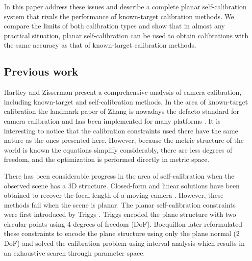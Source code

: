 \documentclass[10pt,twocolumn,letterpaper]{article}
\begin{document}
In this paper address these issues and describe a complete planar self-calibration system that rivals the performance of known-target calibration methods. We compare the limits of both calibration types and show that in almost any practical situation, planar self-calibration can be used to obtain calibrations with the same accuracy as that of known-target calibration methods.


\subsection{Previous work}

Hartley and Zisserman \cite{hartley2003} present a comprehensive analysis of camera calibration, including known-target and self-calibration methods. In the area of known-target calibration the landmark paper of Zhang \cite{zhang1999} is nowadays the defacto standard for camera calibration and has been implemented for many platforms \cite{bouguetMCT,opencv_library}. It is interesting to notice that the calibration constraints used there have the same nature as the ones presented here. However, because the metric structure of the world is known the equations simplify considerably, there are less degrees of freedom, and the optimization is performed directly in metric space. 

There has been considerable progress in the area of self-calibration when the observed scene has a 3D structure. Closed-form and linear solutions have been obtained to recover the focal length of a moving camera \cite{bougnoux1998}. However, these methods fail when the scene is planar. The planar self-calibration constraints were first introduced by Triggs \cite{triggs1998}. Triggs encoded the plane structure with two circular points using 4 degrees of freedom (DoF). Bocquillon \etal \cite{bocquillon2006} later reformulated these constraints to encode the plane structure using only the plane normal (2 DoF) and solved the calibration problem using interval analysis which results in an exhaustive search through parameter space.
\end{document}
